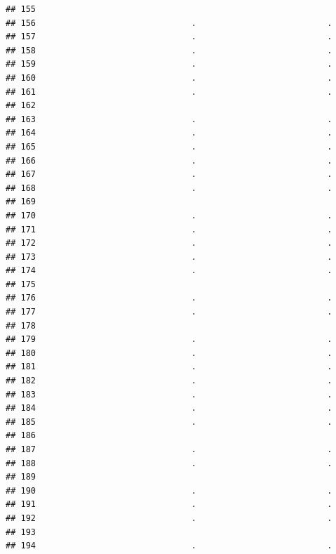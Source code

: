 \documentclass[
]{article}
\begin{document}
\begin{verbatim}
## 155                                                           
## 156                               .                          .
## 157                               .                          .
## 158                               .                          .
## 159                               .                          .
## 160                               .                          .
## 161                               .                          .
## 162                                                           
## 163                               .                          .
## 164                               .                          .
## 165                               .                          .
## 166                               .                          .
## 167                               .                          .
## 168                               .                          .
## 169                                                           
## 170                               .                          .
## 171                               .                          .
## 172                               .                          .
## 173                               .                          .
## 174                               .                          .
## 175                                                           
## 176                               .                          .
## 177                               .                          .
## 178                                                           
## 179                               .                          .
## 180                               .                          .
## 181                               .                          .
## 182                               .                          .
## 183                               .                          .
## 184                               .                          .
## 185                               .                          .
## 186                                                           
## 187                               .                          .
## 188                               .                          .
## 189                                                           
## 190                               .                          .
## 191                               .                          .
## 192                               .                          .
## 193                                                           
## 194                               .                          .

\end{verbatim}
\end{document}
